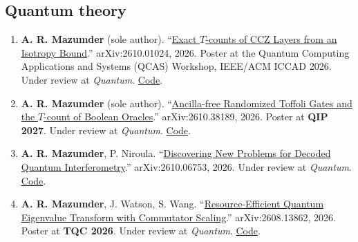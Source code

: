 \documentclass[letterpaper,10pt]{article}
\begin{document}
\subsection*{Quantum theory}
\begin{enumerate}
  \item \textbf{A. R. Mazumder} (sole author). ``\href{https://arxiv.org/abs/2610.01024}{Exact $T$-counts of CCZ Layers from an
  Isotropy Bound}.'' arXiv:2610.01024, 2026. Poster at the Quantum Computing Applications and Systems (QCAS)
  Workshop, IEEE/ACM ICCAD 2026. Under review at \emph{Quantum}. \href{https://github.com/arulrhikm/isotropy-floor-code}{Code}.
  \item \textbf{A. R. Mazumder} (sole author). ``\href{https://arxiv.org/abs/2610.38189}{Ancilla-free Randomized Toffoli Gates and the
  $T$-count of Boolean Oracles}.'' arXiv:2610.38189, 2026. Poster at \textbf{QIP 2027}. Under review at \emph{Quantum}. \href{https://github.com/arulrhikm/randomized-oracle-checks}{Code}.
  \item \textbf{A. R. Mazumder}, P. Niroula. ``\href{https://arxiv.org/abs/2610.06753}{Discovering New Problems for Decoded
  Quantum Interferometry}.'' arXiv:2610.06753, 2026. Under review at \emph{Quantum}. \href{https://github.com/magic-state-labs/dqi-screening-code}{Code}.
  \item \textbf{A. R. Mazumder}, J. Watson, S. Wang. ``\href{https://arxiv.org/abs/2608.13862}{Resource-Efficient
  Quantum Eigenvalue Transform with Commutator Scaling}.'' arXiv:2608.13862, 2026. Poster at \textbf{TQC 2026}. Under review at \emph{Quantum}. \href{https://github.com/arulrhikm/numerics}{Code}.
\end{enumerate}
\end{document}
